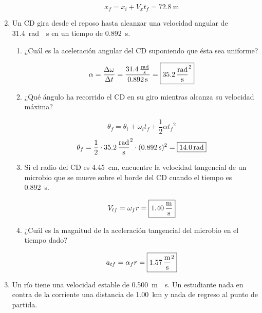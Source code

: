 \documentclass[Análisis.root.tex]{subfiles}
\begin{document}
\begin{enumerate}
\begin{enumerate}
                \[x_f=x_i+V_xt_f=\boxed{\SI{72,8}{\meter}}\]
        \end{enumerate}

  \item Un CD gira desde el reposo hasta alcanzar una velocidad angular de \SI{31,4}{\radian\over\second} en un tiempo de \SI{0,892}{\second}.

        \begin{enumerate}
          \item ¿Cuál es la aceleración angular del CD suponiendo que ésta sea uniforme?

                \[\alpha=\frac{\Delta\omega}{\Delta t}=\frac{\SI{31,4}{\radian\over\second}}{\SI{0,892}{\second}}=\boxed{\SI{35,2}{\radian\over\second\squared}}\]

          \item ¿Qué ángulo ha recorrido el CD en su giro mientras alcanza su velocidad máxima?

                \[\theta_f=\theta_i+\omega_it_f+\frac{1}{2}\alpha{t_f}^2\]
                \[\theta_f=\frac{1}{2}\cdot\SI{35,2}{\radian\over\second\squared}\cdot(\SI{0,892}{\second})^2=\boxed{\SI{14,0}{\radian}}\]

          \item Si el radio del CD es \SI{4,45}{\cm}, encuentre la velocidad tangencial de un microbio que se mueve sobre el borde del CD cuando el tiempo es \SI{0,892}{\second}.

                \[V_{tf}=\omega_f r=\boxed{\SI{1,40}{\meter\over\second}}\]

          \item ¿Cuál es la magnitud de la aceleración tangencial del microbio en el tiempo dado?

                \[a_{tf}=\alpha_f r=\boxed{\SI{1,57}{\meter\over\second\squared}}\]
        \end{enumerate}

  \item Un río tiene una velocidad estable de \SI{0,500}{\meter\over\second}. Un estudiante nada en contra de la corriente una distancia de \SI{1,00}{\km} y nada de regreso al punto de partida.

        \begin{center}
        \end{center}


\end{enumerate}
\end{document}
